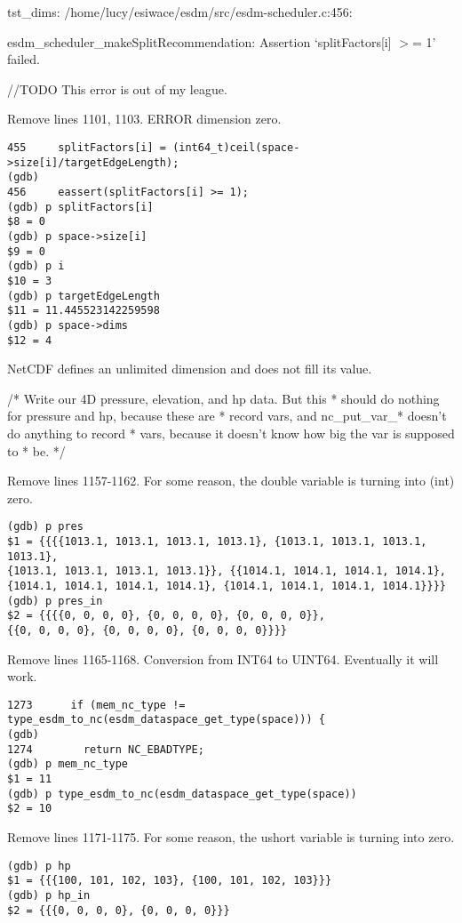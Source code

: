 tst\_dims: /home/lucy/esiwace/esdm/src/esdm-scheduler.c:456:

esdm\_scheduler\_makeSplitRecommendation: Assertion `splitFactors[i] $>$= 1' failed.

//TODO This error is out of my league.

Remove lines 1101, 1103. ERROR dimension zero.

\begin{verbatim}
455	    splitFactors[i] = (int64_t)ceil(space->size[i]/targetEdgeLength);
(gdb)
456	    eassert(splitFactors[i] >= 1);
(gdb) p splitFactors[i]
$8 = 0
(gdb) p space->size[i]
$9 = 0
(gdb) p i
$10 = 3
(gdb) p targetEdgeLength
$11 = 11.445523142259598
(gdb) p space->dims
$12 = 4
\end{verbatim}

NetCDF defines an unlimited dimension and does not fill its value.

/* Write our 4D pressure, elevation, and hp data. But this
 * should do nothing for pressure and hp, because these are
 * record vars, and nc\_put\_var\_* doesn't do anything to record
 * vars, because it doesn't know how big the var is supposed to
 * be. */

Remove lines 1157-1162. For some reason, the double variable is turning into (int) zero.

\begin{verbatim}
(gdb) p pres
$1 = {{{{1013.1, 1013.1, 1013.1, 1013.1}, {1013.1, 1013.1, 1013.1, 1013.1},
{1013.1, 1013.1, 1013.1, 1013.1}}, {{1014.1, 1014.1, 1014.1, 1014.1},
{1014.1, 1014.1, 1014.1, 1014.1}, {1014.1, 1014.1, 1014.1, 1014.1}}}}
(gdb) p pres_in
$2 = {{{{0, 0, 0, 0}, {0, 0, 0, 0}, {0, 0, 0, 0}},
{{0, 0, 0, 0}, {0, 0, 0, 0}, {0, 0, 0, 0}}}}
\end{verbatim}

Remove lines 1165-1168. Conversion from INT64 to UINT64. Eventually it will work.

\begin{verbatim}
1273	  if (mem_nc_type != type_esdm_to_nc(esdm_dataspace_get_type(space))) {
(gdb)
1274	    return NC_EBADTYPE;
(gdb) p mem_nc_type
$1 = 11
(gdb) p type_esdm_to_nc(esdm_dataspace_get_type(space))
$2 = 10
\end{verbatim}

Remove lines 1171-1175. For some reason, the ushort variable is turning into zero.

\begin{verbatim}
(gdb) p hp
$1 = {{{100, 101, 102, 103}, {100, 101, 102, 103}}}
(gdb) p hp_in
$2 = {{{0, 0, 0, 0}, {0, 0, 0, 0}}}
\end{verbatim}

